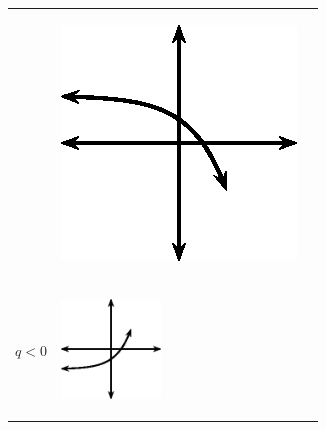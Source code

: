 \begin{center}
\begin{xtabular*}{\mytablewidth}[t]{|p{10\mystarwidth}|p{10\mystarwidth}|p{10\mystarwidth}|}
\begin{center}
\vspace{2pt}
\vspace{.1in}
\end{center}    
    &
\setcounter{subfigure}{0}
\label{m39348*id250558}
\begin{center}
\label{m39348*id250558!!!underscore!!!media}\label{m39348*id250558!!!underscore!!!printimage}\includegraphics[width100px]{col11306.imgs/m39348_MG10C11_029.png} %
\vspace{2pt}
\vspace{.1in}
\end{center}    
\tabularnewline{}
    $q<0$
    &
\setcounter{subfigure}{0}
\label{m39348*id250596}
\begin{center}
\label{m39348*id250596!!!underscore!!!media}\label{m39348*id250596!!!underscore!!!printimage}\includegraphics[width=100px]{col11306.imgs/m39348_MG10C11_030.png} %
\vspace{2pt}
\vspace{.1in}

\end{center}
\end{xtabular*}
\end{center}
